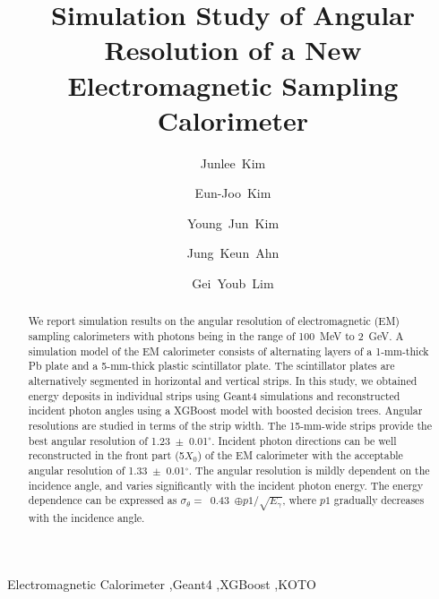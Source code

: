 \documentclass[preprint,12pt,times,a4paper]{elsarticle}
\begin{document}
\begin{frontmatter}

\setcounter{page}{0}
\title{Simulation Study of Angular Resolution of a New Electromagnetic Sampling Calorimeter}

\author[jbnu]{Junlee~Kim}

\author[jbnu]{Eun-Joo~Kim}

\author[korea]{Young~Jun~Kim}
\author[korea]{Jung~Keun~Ahn}
\author[kek]{Gei~Youb~Lim}

\address[jbnu]{Division of Science Education, Jeonbuk National University, Jeonju 54896, Korea}
\address[korea]{Department of Physics, Korea University, Seoul 02841, Korea}
\address[kek]{Institute of Particle and Nuclear Studies (IPNS), High Energy Accelerator Research Organization (KEK), Tsukuba 305-0801, Japan}


\begin{abstract}
We report simulation results on the angular resolution of electromagnetic (EM) sampling calorimeters with photons being in the range of 100~MeV to 2~GeV. A simulation model of the EM calorimeter consists of alternating layers of a 1-mm-thick Pb plate and a 5-mm-thick plastic scintillator plate. The scintillator plates are alternatively segmented in horizontal and vertical strips. In this study, we obtained energy deposits in individual strips using Geant4 simulations and reconstructed incident photon angles using a XGBoost model with boosted decision trees. Angular resolutions are studied in terms of the strip width. The 15-mm-wide strips provide the best angular resolution of 1.23~$\pm$~0.01$^{\circ}$. Incident photon directions can be well reconstructed in the front part (5$X_{0}$) of the EM calorimeter with the acceptable angular resolution of 1.33~$\pm$~0.01$^{\circ}$. The angular resolution is mildly dependent on the incidence angle, and varies significantly with the incident photon energy. The energy dependence can be expressed as $\sigma_{\theta}=$~0.43~$\oplus p1 /\sqrt{E_{\gamma}}$, where $p1$ gradually decreases with the incidence angle.

\end{abstract}
\begin{keyword}
Electromagnetic Calorimeter \sep Geant4 \sep XGBoost \sep KOTO
\end{keyword}

\end{frontmatter}
\end{document}
